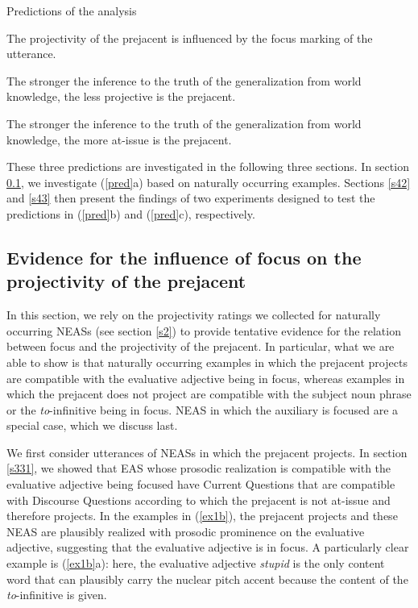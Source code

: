\documentclass[11pt,fleqn]{article}
\newcommand{\6}{\mbox{$[\hspace*{-.6mm}[$}}
\newcommand{\9}{\mbox{$]\hspace*{-.6mm}]$}}
\begin{document}
\begin{exe}
\ex\label{pred} Predictions of the analysis 

\begin{xlist}

\ex The projectivity of the prejacent is influenced by the focus marking of the utterance.

\ex The stronger the inference to the truth of the generalization from world knowledge, the less projective is the prejacent.

\ex The stronger the inference to the truth of the generalization from world knowledge, the more at-issue is the prejacent.

\end{xlist}
\end{exe}

These three predictions are investigated in the following three sections. In section \ref{s41}, we investigate (\ref{pred}a) based on naturally occurring examples. Sections \ref{s42} and \ref{s43} then present the findings of two experiments designed to test the predictions in (\ref{pred}b) and (\ref{pred}c), respectively.

\subsection{Evidence for the influence of focus on the projectivity of the prejacent}\label{s41}

In this section, we rely on the projectivity ratings we collected for naturally occurring NEASs (see section \ref{s2}) to provide tentative evidence for the relation between focus and the projectivity of the prejacent. In particular, what we are able to show is that naturally occurring examples in which the prejacent projects are compatible with the evaluative adjective being in focus, whereas examples in which the prejacent does not project are compatible with the subject noun phrase or the {\em to}-infinitive being in focus. NEAS in which the auxiliary is focused are a special case, which we discuss last. 

We first consider utterances of NEASs in which the prejacent projects. In section \ref{s331}, we showed that EAS whose prosodic realization is compatible with the evaluative adjective being focused have Current Questions that are compatible with Discourse Questions according to which the prejacent is not at-issue and therefore projects. In the examples in (\ref{ex1b}), the prejacent projects and these NEAS are plausibly realized with prosodic prominence on the evaluative adjective, suggesting that the evaluative adjective is in focus. A particularly clear example is (\ref{ex1b}a): here, the evaluative adjective {\em stupid} is the only content word that can plausibly carry the nuclear pitch accent because the content of the {\em to}-infinitive is given.
\end{document}

